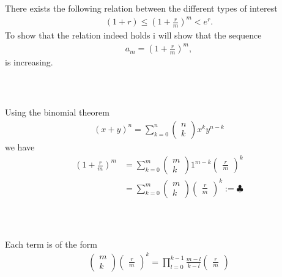 \documentclass{beamer}
\numberwithin{equation}{section}
\begin{document}
\begin{frame}\frametitle{{\normalsize \secname} \\ {\large \subsecname}}
    There exists the following relation between the different types of interest
    \begin{align}
        (1 + r) \leq \left(1 + \frac{r}{m}\right)^m < e^r.
    \end{align}
    To show that the relation indeed holds i will show that the sequence
    \begin{align}
        a_m = \left(1 + \frac{r}{m}\right)^m,
    \end{align}
    is increasing.
\end{frame}

\begin{frame}\frametitle{{\normalsize \secname} \\ {\large \subsecname}}
    Using the binomial theorem
    \begin{align*}
        (x+y)^n = \sum_{k=0}^n \begin{pmatrix} n \\ k \end{pmatrix} x^k y^{n-k}
    \end{align*}
    we have 
    \begin{align*}
        \left( 1 + \frac{r}{m} \right)^m &= \sum_{k=0}^m \begin{pmatrix} m \\ k \end{pmatrix} 1^{m-k}\begin{pmatrix} \frac{r}{m} \end{pmatrix}^k\\
        &= \sum_{k=0}^m \begin{pmatrix} m \\ k \end{pmatrix} \begin{pmatrix} \frac{r}{m} \end{pmatrix}^k := \clubsuit
    \end{align*}
\end{frame}

\begin{frame}\frametitle{{\normalsize \secname} \\ {\large \subsecname}}
    Each term is of the form
    \begin{align*}
        \begin{pmatrix} m \\ k \end{pmatrix}\begin{pmatrix} \frac{r}{m} \end{pmatrix}^k = \prod_{l=0}^{k-1} \frac{m-l}{k - l} \begin{pmatrix} \frac{r}{m} \end{pmatrix}
    \end{align*}
\end{frame}
\end{document}
